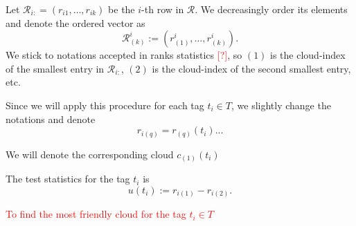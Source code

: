 \documentclass{llncs}
\begin{document}
Let $\mathcal{R}_{i:} = (r_{i1}, \dots, r_{ik})$ be the $i$-th row in $\mathcal{R}$. We decreasingly order its elements and denote the ordered vector as
\[
\mathcal{R}^{i}_{(k)} := (r^{i}_{(1)}, \dots, r^{i}_{(k)}).
\]
We stick to notations accepted in ranks statistics \textcolor{red}{[?]}, so $(1)$ is the cloud-index of the smallest entry in $\mathcal{R}_{i:}$, ${(2)}$ is the cloud-index of the second smallest entry, etc.

Since we will apply this procedure for each tag $t_i\in T$, we slightly change the notations and denote 
\[
r_{i(q)} = r_{(q)}(t_i)...
\]


We will denote the corresponding cloud $c_{(1)}(t_i)$



The test statistics for the tag $t_i$ is
\[
u(t_i) := r_{i(1)} -  r_{i(2)}.
\]

\textcolor{red}{To find the most friendly cloud for the tag $t_i\in T$}












\end{document}
